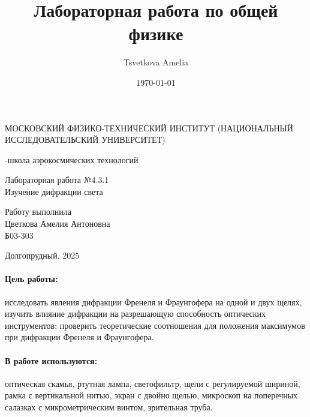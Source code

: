\documentclass[a4paper,12pt]{article}
\author{Tsvetkova Amelia}
\title{Лабораторная работа по общей физике}
\date{\today}
\begin{document}
\begin{titlepage}
    \newpage
    \begin{center}
    {\large МОСКОВСКИЙ ФИЗИКО-ТЕХНИЧЕСКИЙ ИНСТИТУТ (НАЦИОНАЛЬНЫЙ ИССЛЕДОВАТЕЛЬСКИЙ УНИВЕРСИТЕТ)}
    \vspace{1cm}

    {-школа аэрокосмических технологий}
    \vspace{6em}
    \end{center}
    
    \vspace{1.2em}

    \begin{center}
    \Large Лабораторная работа №4.3.1 \\
    Изучение дифракции света
    \linebreak
    \end{center}
    
    \vspace{11em}
    
    \begin{flushright}
                       {\large Работу выполнила\\
                       Цветкова Амелия Антоновна\\
                       Б03-303 }
    \end{flushright}

    \vspace{\fill}

    \begin{center}
    Долгопрудный, 2025
    \end{center}

    \end{titlepage}

\paragraph{Цель работы:} исследовать явления дифракции Френеля и Фраунгофера на одной и двух щелях, изучить влияние дифракции на разрешающую способность оптических инструментов; проверить теоретические соотношения для положения максимумов при дифракции Френеля и Фраунгофера.

\paragraph{В работе используются:} оптическая скамья, ртутная лампа, светофильтр, щели с регулируемой шириной, рамка с вертикальной нитью, экран с двойно щелью, микроскоп на поперечных салазках с микрометрическим винтом, зрительная труба.
\end{document}
